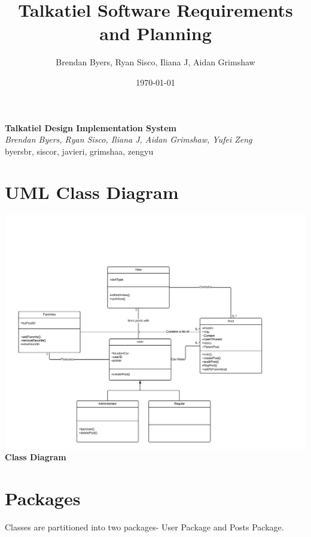 \documentclass[12pt]{article}
\title{Talkatiel Software Requirements and Planning}
\author{Brendan Byers, Ryan Sisco, Iliana J, Aidan Grimshaw}
\date{\today}
\begin{document}
\begin{center}
      \Large\textbf{Talkatiel Design Implementation System}\\
      \large\textit{Brendan Byers, Ryan Sisco, Iliana J, Aidan Grimshaw, Yufei Zeng}\\
      \large{byersbr, siscor, javieri, grimshaa, zengyu}\\
   \end{center}

\tableofcontents

\section{UML Class Diagram}
\begin{center}
\includegraphics[scale=0.75]{img/uml/ClassDiagram}\linebreak
\textbf{Class Diagram}
  \end{center}

\section{Packages}

Classes are partitioned into two packages- User Package and Posts Package.
\end{document}
